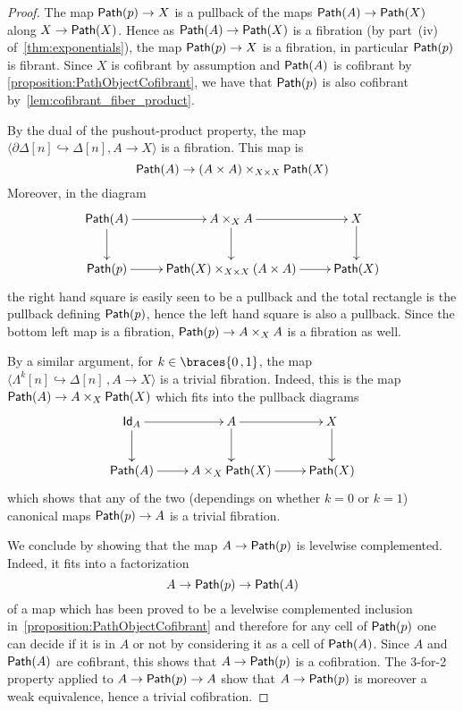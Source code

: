 \documentclass[reqno,10pt,a4paper,oneside,draft]{amsart}
\begin{document}
\begin{proof} The map $\mathsf{Path}(p) \rightarrow X$ is a pullback of the maps $\mathsf{Path}(A) \rightarrow \mathsf{Path}(X)$ along $X \rightarrow \mathsf{Path}(X)$. Hence as $\mathsf{Path}(A) \rightarrow \mathsf{Path}(X)$ is a fibration (by part~(iv) 
of~\cref{thm:exponentials}), the map $\mathsf{Path}(p) \rightarrow X$ is a fibration, in particular $\mathsf{Path}(p)$ is fibrant. Since $X$ is cofibrant by assumption and $\mathsf{Path}(A)$ is  cofibrant by \cref{proposition:PathObjectCofibrant}, we have that $\mathsf{Path}(p)$ is also cofibrant by~\cref{lem:cofibrant_fiber_product}. 

By the dual of the pushout-product property, the map $\langle \partial \Delta[n] \hookrightarrow \Delta[n] ,  A \rightarrow X \rangle$ is a fibration. This map is 
\[ 
\mathsf{Path}(A) \rightarrow (A \times A) \times_{X \times X} \mathsf{Path}(X)
\] 
Moreover, in the diagram
\[
\xymatrix{
\Path(A) \ar[r] \ar[d] & A \times_{X} A \ar[d] \ar[r] & X \ar[d] \\
\Path(p) \ar[r] & \Path(X) \times_{X \times X}  (A \times A) \ar[r]  & \Path(X)
}
 \]
the right hand square is easily seen to be a pullback and the total rectangle is the pullback defining $\mathsf{Path}(p)$, hence the left hand square is also a pullback. Since the bottom left map is a fibration,  $\mathsf{Path}(p) \rightarrow A \times_{X} A$ is a fibration as well.

By a similar argument, for $k \in \braces{ 0 \, , 1}$, the map $\langle \Lambda^k[n] \hookrightarrow \Delta[n] \, , A \rightarrow X\rangle$ is a trivial fibration. Indeed, this is the map $\mathsf{Path}(A) \rightarrow  A  \times_X \mathsf{Path}(X)$ which fits into the pullback diagrams
\[
\xymatrix{
\Id_A \ar[r] \ar[d] & A  \ar[d] \ar[r] & X \ar[d] \\
\Path(A) \ar[r] & A \times_X \Path(X) \ar[r]  & \Path(X)
}
 \]
which  shows that any of the two (dependings on whether $k=0$ or $k=1$) canonical maps $\mathsf{Path}(p) \rightarrow A$ is a trivial fibration.

We conclude by showing that the map $A \rightarrow \mathsf{Path}(p)$ is levelwise complemented. Indeed, it fits into a factorization 
\[
A \rightarrow \mathsf{Path}(p) \rightarrow \mathsf{Path}(A)
\] 
of a map which has been proved to be a levelwise complemented inclusion in~\cref{proposition:PathObjectCofibrant} and therefore for any cell of $\mathsf{Path}(p)$ one can decide if it is in $A$ or not by considering it as a cell of $\mathsf{Path}(A)$. Since $A$ and $\mathsf{Path}(A)$ are cofibrant, this shows that $A \rightarrow \mathsf{Path}(p)$ is a cofibration. The 3-for-2 property applied to $A \rightarrow \mathsf{Path}(p) \rightarrow A$ show that  $A \rightarrow \mathsf{Path}(p)$ is moreover a weak equivalence, hence a trivial cofibration.
\end{proof}
\end{document}
